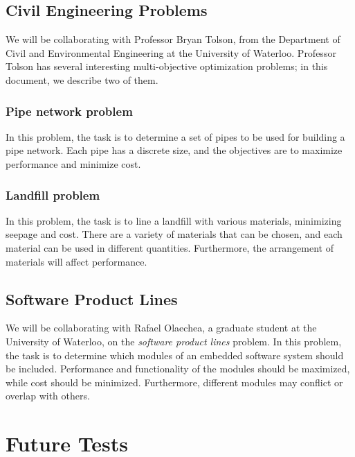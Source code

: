 \documentclass[11pt]{article}
\begin{document}
\subsection{Civil Engineering Problems}

We will be collaborating with Professor Bryan Tolson, from the
Department of Civil and Environmental Engineering at the University of
Waterloo. Professor Tolson has several interesting multi-objective
optimization problems; in this document, we describe two of them.

\subsubsection{Pipe network problem}

In this problem, the task is to determine a set of pipes to be used for
building a pipe network. Each pipe has a discrete size, and the
objectives are to maximize performance and minimize cost.

\subsubsection{Landfill problem}

In this problem, the task is to line a landfill with various materials,
minimizing seepage and cost. There are a variety of materials that can
be chosen, and each material can be used in different quantities.
Furthermore, the arrangement of materials will affect performance.

\subsection{Software Product Lines}

We will be collaborating with Rafael Olaechea, a graduate student at
the University of Waterloo, on the \textit{software product lines}
problem. In this problem, the task is to determine which modules of an
embedded software system should be included. Performance and
functionality of the modules should be maximized, while cost should be
minimized. Furthermore, different modules may conflict or overlap with
others.

\section{Future Tests}

\printbibliography[heading=bibintoc]
\end{document}
